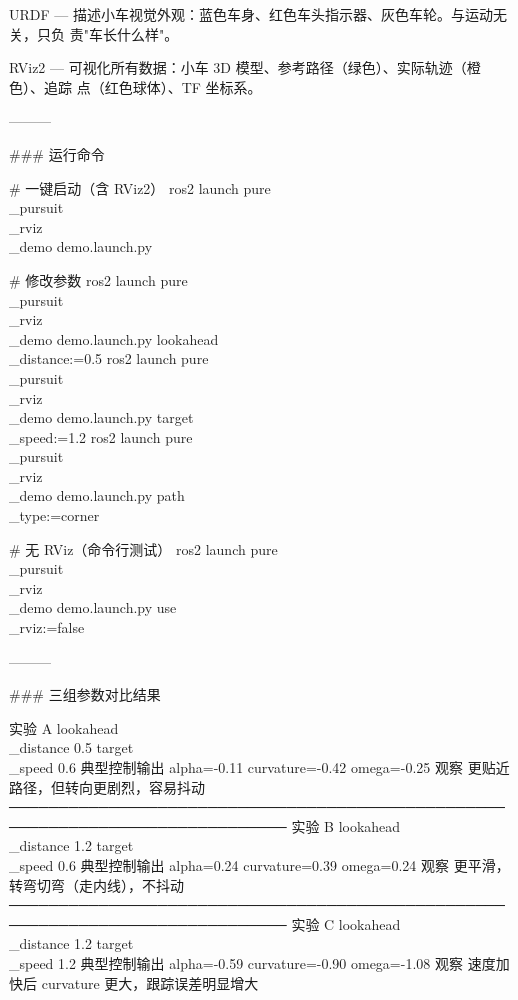 \documentclass[a4paper,12pt]{book}
\begin{document}
{  URDF — 描述小车视觉外观：蓝色车身、红色车头指示器、灰色车轮。与运动无关，只负
  责"车长什么样"。

  RViz2 — 可视化所有数据：小车 3D 模型、参考路径（绿色）、实际轨迹（橙色）、追踪
  点（红色球体）、TF 坐标系。

  ———

  ### 运行命令

  # 一键启动（含 RViz2）
  ros2 launch pure\\_pursuit\\_rviz\\_demo demo.launch.py

  # 修改参数
  ros2 launch pure\\_pursuit\\_rviz\\_demo demo.launch.py lookahead\\_distance:=0.5
  ros2 launch pure\\_pursuit\\_rviz\\_demo demo.launch.py target\\_speed:=1.2
  ros2 launch pure\\_pursuit\\_rviz\\_demo demo.launch.py path\\_type:=corner

  # 无 RViz（命令行测试）
  ros2 launch pure\\_pursuit\\_rviz\\_demo demo.launch.py use\\_rviz:=false

  ———

  ### 三组参数对比结果

   实验                A
   lookahead\\_distance  0.5
   target\\_speed        0.6
   典型控制输出        alpha=-0.11 curvature=-0.42 omega=-0.25
   观察                更贴近路径，但转向更剧烈，容易抖动
  ──────────────────────────────────────────────────────────────────────────────
   实验                B
   lookahead\\_distance  1.2
   target\\_speed        0.6
   典型控制输出        alpha=0.24 curvature=0.39 omega=0.24
   观察                更平滑，转弯切弯（走内线），不抖动
  ──────────────────────────────────────────────────────────────────────────────
   实验                C
   lookahead\\_distance  1.2
   target\\_speed        1.2
   典型控制输出        alpha=-0.59 curvature=-0.90 omega=-1.08
   观察                速度加快后 curvature 更大，跟踪误差明显增大

}
\end{document}
